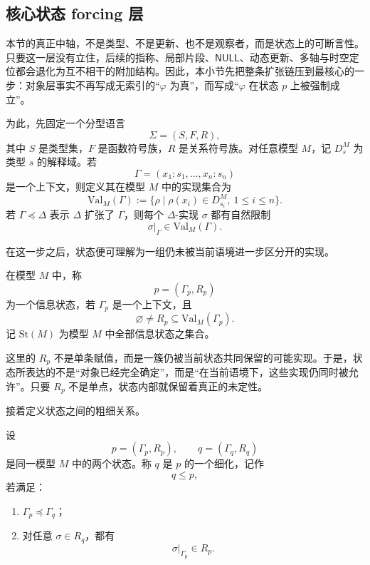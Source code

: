 \subsection{核心状态 forcing 层}\label{subsec:logic-expansion-chain-state-forcing}

本节的真正中轴，不是类型、不是更新、也不是观察者，而是状态上的可断言性。只要这一层没有立住，后续的指称、局部片段、\(\mathsf{NULL}\)、动态更新、多轴与时空定位都会退化为互不相干的附加结构。因此，本小节先把整条扩张链压到最核心的一步：对象层事实不再写成无索引的“\(\varphi\) 为真”，而写成“\(\varphi\) 在状态 \(p\) 上被强制成立”。

为此，先固定一个分型语言
\[
\Sigma=(S,F,R),
\]
其中 \(S\) 是类型集，\(F\) 是函数符号族，\(R\) 是关系符号族。对任意模型 \(M\)，记 \(D_s^M\) 为类型 \(s\) 的解释域。若
\[
\Gamma=(x_1:s_1,\dots,x_n:s_n)
\]
是一个上下文，则定义其在模型 \(M\) 中的实现集合为
\[
\mathrm{Val}_M(\Gamma)
:=
\bigl\{\rho \mid \rho(x_i)\in D_{s_i}^M,\ 1\le i\le n\bigr\}.
\]
若 \(\Gamma\preceq \Delta\) 表示 \(\Delta\) 扩张了 \(\Gamma\)，则每个 \(\Delta\)-实现 \(\sigma\) 都有自然限制
\[
\sigma|_\Gamma \in \mathrm{Val}_M(\Gamma).
\]

在这一步之后，状态便可理解为一组仍未被当前语境进一步区分开的实现。

\begin{definition}[信息状态]\label{def:logic-expansion-information-state}
在模型 \(M\) 中，称
\[
p=(\Gamma_p,R_p)
\]
为一个信息状态，若 \(\Gamma_p\) 是一个上下文，且
\[
\varnothing\neq R_p\subseteq \mathrm{Val}_M(\Gamma_p).
\]
记 \(\mathrm{St}(M)\) 为模型 \(M\) 中全部信息状态之集合。
\end{definition}

这里的 \(R_p\) 不是单条赋值，而是一簇仍被当前状态共同保留的可能实现。于是，状态所表达的不是“对象已经完全确定”，而是“在当前语境下，这些实现仍同时被允许”。只要 \(R_p\) 不是单点，状态内部就保留着真正的未定性。

接着定义状态之间的粗细关系。

\begin{definition}[细化]\label{def:logic-expansion-refinement}
设
\[
p=(\Gamma_p,R_p),
\qquad
q=(\Gamma_q,R_q)
\]
是同一模型 \(M\) 中的两个状态。称 \(q\) 是 \(p\) 的一个细化，记作
\[
q\le p,
\]
若满足：
\begin{enumerate}
  \item \(\Gamma_p\preceq \Gamma_q\)；
  \item 对任意 \(\sigma\in R_q\)，都有
  \[
  \sigma|_{\Gamma_p}\in R_p.
  \]
\end{enumerate}
\end{definition}

